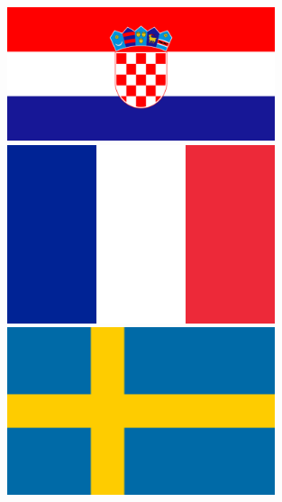 \documentclass[12pt]{article}
\begin{document}
        \begin{figure} [h!]
            \begin{minipage}[c]{0.28\linewidth}
                \includegraphics[width=0.7\textwidth]{./Pictures/cro.png}
            \end{minipage}
            \hfill
            \begin{minipage}[c]{0.22\linewidth}
                \includegraphics[width=0.7\textwidth]{./Pictures/france.png}
            \end{minipage}
            \hfill
            \begin{minipage}[c]{0.23\linewidth}
                \hfill
                \includegraphics[width=0.7\textwidth]{./Pictures/sweden.png}
            \end{minipage}
            \hfill
            \begin{minipage}[c]{0.24\linewidth}
                \hfill

\end{minipage}
\end{figure}
\end{document}
